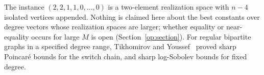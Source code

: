 The instance $(2,2,1,1,0,\ldots,0)$ is a two-element realization space with
$n-4$ isolated vertices appended. Nothing is claimed here about the best
constants over degree vectors whose realization spaces are larger; whether
equality or near-equality occurs for large $M$ is open
(Section~\ref{op:section}). For regular bipartite graphs in a specified
degree range, Tikhomirov and Youssef~\cite{TY23} proved sharp Poincar\'e
bounds for the switch chain, and sharp log-Sobolev bounds for fixed degree.
